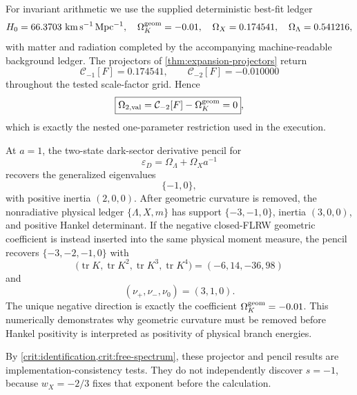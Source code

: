 \documentclass[aps,prd,preprint,onecolumn,nofootinbib,superscriptaddress,showkeys]{revtex4-2}
\numberwithin{equation}{section}
\theoremstyle{definition}
\theoremstyle{plain}
\begin{document}
For invariant arithmetic we use the supplied deterministic best-fit ledger
\begin{equation}
H_0=66.3703\ {\rm km\,s^{-1}\,Mpc^{-1}},\quad
\Omega_K^{\rm geom}=-0.01,\quad
\Omega_X=0.174541,\quad
\Omega_\Lambda=0.541216,
\end{equation}
with matter and radiation completed by the accompanying machine-readable background ledger.  The projectors of \cref{thm:expansion-projectors} return
\begin{equation}
\boxed{\mathcal C_{-1}[F]=0.174541},
\qquad
\boxed{\mathcal C_{-2}[F]=-0.010000}
\end{equation}
throughout the tested scale-factor grid.  Hence
\begin{equation}
\boxed{\Omega_{2,{\rm val}}=\mathcal C_{-2}[F]-\Omega_K^{\rm geom}=0},
\end{equation}
which is exactly the nested one-parameter restriction used in the execution.

At \(a=1\), the two-state dark-sector derivative pencil for
\begin{equation}
\varepsilon_D=\Omega_\Lambda+\Omega_Xa^{-1}
\end{equation}
recovers the generalized eigenvalues
\begin{equation}
\boxed{\{-1,0\}},
\end{equation}
with positive inertia \((2,0,0)\).  After geometric curvature is removed, the nonradiative physical ledger \(\{\Lambda,X,m\}\) has support \(\{-3,-1,0\}\), inertia \((3,0,0)\), and positive Hankel determinant.  If the negative closed-FLRW geometric coefficient is instead inserted into the same physical moment measure, the pencil recovers \(\{-3,-2,-1,0\}\) with
\begin{equation}
\bigl(\operatorname{tr}K,\operatorname{tr}K^2,
\operatorname{tr}K^3,\operatorname{tr}K^4\bigr)
=(-6,14,-36,98)
\end{equation}
and
\begin{equation}
\boxed{(\nu_+,\nu_-,\nu_0)=(3,1,0)}.
\end{equation}
The unique negative direction is exactly the coefficient \(\Omega_K^{\rm geom}=-0.01\).  This numerically demonstrates why geometric curvature must be removed before Hankel positivity is interpreted as positivity of physical branch energies.

By \cref{crit:identification,crit:free-spectrum}, these projector and pencil results are implementation-consistency tests.  They do not independently discover \(s=-1\), because \(w_X=-2/3\) fixes that exponent before the calculation.
\end{document}
